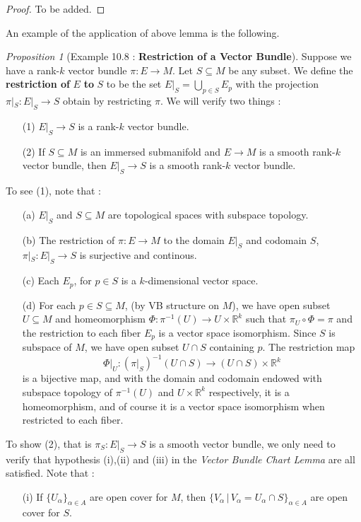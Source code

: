 \documentclass[a4paper]{article}
\theoremstyle{remark}
\newtheorem{prop}{Proposition}
\newcommand{\rk}{\mathbb{R}^k} %
\newcommand{\subhim}{\subseteq} %
\begin{document}
\begin{proof}
To be added.
\end{proof}
An example of the application of above lemma is the following.
\begin{prop}[Example 10.8 : \textbf{Restriction of a Vector Bundle}]
Suppose we have a rank-$k$ vector bundle $\pi : E \to M$. Let $S \subhim M$ be any subset. We define the \textbf{restriction of }$E$ \textbf{ to }$S$ to be the set $E|_S = \bigcup_{p \in S} E_p$ with the projection $\pi|_S : E|_S \to S$ obtain by restricting $\pi$. We will verify two things :
\begin{enumerate}[nolistsep]
\item[(1)] $E|_S \to S$ is a rank-$k$ vector bundle.
\item[(2)] If $S\subhim M$ is an immersed submanifold and $E \to M$ is a smooth rank-$k$ vector bundle, then $E|_S \to S$ is a smooth rank-$k$ vector bundle.
\end{enumerate}
To see (1), note that :
\begin{enumerate}[nolistsep]
\item[(a)] $E|_S$ and $S\subhim M$ are topological spaces with subspace topology. 
\item[(b)] The restriction of $\pi : E \to M$ to the domain $E|_S$ and codomain $S$, $\pi|_S : E|_S \to S$ is surjective and continous.
\item[(c)] Each $E_p$, for $p\in S$ is a $k$-dimensional vector space. 
\item[(d)] For each $p \in S\subhim M$, (by VB structure on $M$), we have open subset $U \subhim M$ and homeomorphism $\Phi : \pi^{-1}(U) \to U \times \rk$ such that $\pi_U \circ \Phi = \pi$  and the restriction to each fiber $E_p$ is a vector space isomorphism. Since $S$ is subspace of $M$, we have open subset $U \cap S$ containing $p$. The restriction map 
$$
\Phi|_U : (\pi|_S)^{-1}(U\cap S) \to (U\cap S)\times \rk
$$
is a bijective map, and with the domain and codomain endowed with subspace topology of $\pi^{-1}(U)$ and $U\times \rk$ respectively, it is a homeomorphism, and of course it is a vector space isomorphism when restricted to each fiber.
\end{enumerate}  
To show (2), that is $\pi_S : E|_S \to S$ is a smooth vector bundle, we only need to verify that hypothesis (i),(ii) and (iii) in the \textit{Vector Bundle Chart Lemma} are all satisfied. Note that :
\begin{enumerate}[nolistsep]
\item[(i)] If $\{ U_{\alpha} \}_{\alpha \in A}$ are open cover for $M$, then  $\{V_{\alpha} \, | \, V_{\alpha} = U_{\alpha} \cap S\}_{\alpha \in A}$ are open cover for $S$.

\end{enumerate}
\end{prop}
\end{document}
